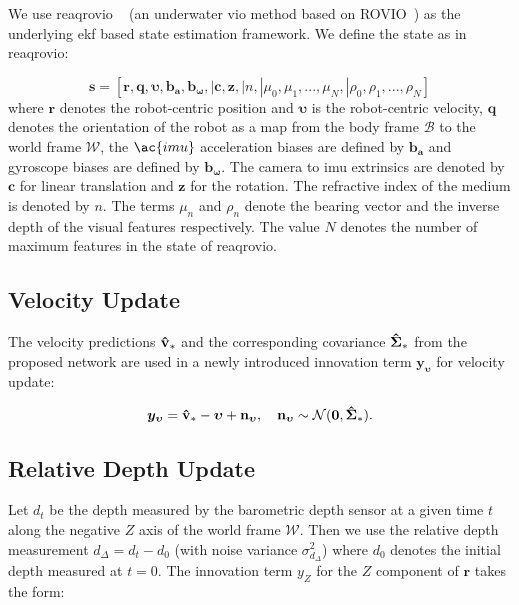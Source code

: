 We use \ac{reaqrovio} ~\cite{SinghRCMinRovio2024} (an underwater \ac{vio} method based on ROVIO~\cite{bloesch2015robust}) as the underlying \ac{ekf} based state estimation framework. We define the state as in \ac{reaqrovio}:

\small
\begin{equation}
    \mathbf{s}=\left[\mathbf{r}, \mathbf{q}, \boldsymbol{\upsilon}, \mathbf{b}_{\mathbf{a}}, \mathbf{b}_{\boldsymbol{\omega}},| \mathbf{c}, \mathbf{z},|n,| \mu_{0}, \mu_{1}, ...,\mu_{N},| \rho_{0}, \rho_{1}, ..., \rho_{N}\right]
\end{equation}
\normalsize
where $\mathbf{r}$ denotes the robot-centric position and $\boldsymbol{\upsilon}$ is the robot-centric velocity, $\mathbf{q}$ denotes the orientation of the robot as a map from the body frame $\mathcal{B}$ to the world frame $\mathcal{W}$, the $\ac{imu}$ acceleration biases are defined by $\mathbf{b}_{\mathbf{a}}$ and gyroscope biases are defined by $\mathbf{b}_{\boldsymbol{\omega}}$. The camera to \ac{imu} extrinsics are denoted by $\mathbf{c}$ for linear translation and $\mathbf{z}$ for the rotation. The refractive index of the medium is denoted by $n$. The terms $\mu_{n}$ and $\rho_{n}$ denote the bearing vector and the inverse depth of the visual features respectively. The value $N$ denotes the number of maximum features in the state of \ac{reaqrovio}.

\subsection{Velocity Update} The velocity predictions $\mathbf{\hat{v}}_{*}$ and the corresponding covariance $\mathbf{\hat{\Sigma}}_{*}$ from the proposed network are used in a newly introduced innovation term $\mathbf{y}_{\boldsymbol{\upsilon}}$ for velocity update:

\begin{equation}
    \boldsymbol{y}_{\boldsymbol{\upsilon}}= \mathbf{\hat{v}}_{*} - \boldsymbol{\upsilon} + \mathbf{n}_{{\boldsymbol{\upsilon}}},\quad\mathbf{n}_{\boldsymbol{\upsilon}}\sim\mathcal{N}(\mathbf{0}, \mathbf{\hat{\Sigma}}_*).
\end{equation}

\subsection{Relative Depth Update} Let $d_{t}$ be the depth measured by the barometric depth sensor at a given time $t$ along the negative $Z$ axis of the world frame $\mathcal{W}$. Then we use the relative depth measurement $d_{\Delta}=d_{t}-d_{0}$ (with noise variance $\sigma_{d_\Delta}^{2}$) where $d_{0}$ denotes the initial depth measured at $t=0$. The innovation term $y_{Z}$ for the $Z$ component of $\mathbf{r}$ takes the form: 

